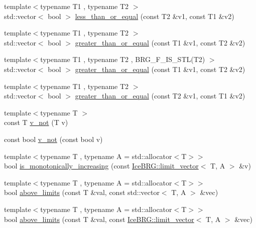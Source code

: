 \begin{DoxyCompactItemize}
\item 
{\footnotesize template$<$typename T1 , typename T2 $>$ }\\std\-::vector$<$ bool $>$ \hyperlink{namespaceIceBRG_abf00adcaf63fe850211a15ed53809400}{less\-\_\-than\-\_\-or\-\_\-equal} (const T2 \&v1, const T1 \&v2)
\item 
{\footnotesize template$<$typename T1 , typename T2 $>$ }\\std\-::vector$<$ bool $>$ \hyperlink{namespaceIceBRG_ae127b6cb8c91e296de8533f11d67592a}{greater\-\_\-than\-\_\-or\-\_\-equal} (const T1 \&v1, const T2 \&v2)
\item 
{\footnotesize template$<$typename T1 , typename T2 , B\-R\-G\-\_\-\-F\-\_\-\-I\-S\-\_\-\-S\-T\-L(\-T2) $>$ }\\std\-::vector$<$ bool $>$ \hyperlink{namespaceIceBRG_a754e0fd68894a6914c0b069594a45e90}{greater\-\_\-than\-\_\-or\-\_\-equal} (const T1 \&v1, const T2 \&v2)
\item 
{\footnotesize template$<$typename T1 , typename T2 $>$ }\\std\-::vector$<$ bool $>$ \hyperlink{namespaceIceBRG_a4a9541ae4d7ace0ccf0dac1df41ea0e7}{greater\-\_\-than\-\_\-or\-\_\-equal} (const T2 \&v1, const T1 \&v2)
\item 
{\footnotesize template$<$typename T $>$ }\\const T \hyperlink{namespaceIceBRG_a984be4397fcd5e074b7868a630ea1726}{v\-\_\-not} (T v)
\item 
const bool \hyperlink{namespaceIceBRG_a23b9cbe4ecc6be9a47f62631832ca8b1}{v\-\_\-not} (const bool v)
\item 
{\footnotesize template$<$typename T , typename A  = std\-::allocator$<$\-T$>$$>$ }\\bool \hyperlink{namespaceIceBRG_ae2148f6d961c8db175a69be787359dfe}{is\-\_\-monotonically\-\_\-increasing} (const \hyperlink{classIceBRG_1_1limit__vector}{Ice\-B\-R\-G\-::limit\-\_\-vector}$<$ T, A $>$ \&v)
\item 
{\footnotesize template$<$typename T , typename A  = std\-::allocator$<$\-T$>$$>$ }\\bool \hyperlink{namespaceIceBRG_a4bcaa29d9318ef306312f1c51db11668}{above\-\_\-limits} (const T \&val, const std\-::vector$<$ T, A $>$ \&vec)
\item 
{\footnotesize template$<$typename T , typename A  = std\-::allocator$<$\-T$>$$>$ }\\bool \hyperlink{namespaceIceBRG_afb58e3b6322418f5f9f8cde4a71b0d2b}{above\-\_\-limits} (const T \&val, const \hyperlink{classIceBRG_1_1limit__vector}{Ice\-B\-R\-G\-::limit\-\_\-vector}$<$ T, A $>$ \&vec)

\end{DoxyCompactItemize}
